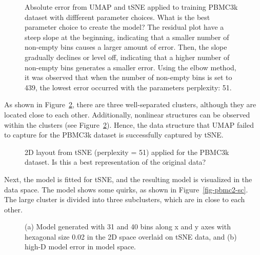 \documentclass[
  12pt]{article}
\begin{document}
\begin{figure}[H]


\caption{\label{fig-abserrorPBMC}Absolute error from UMAP and tSNE
applied to training PBMC3k dataset with diffferent parameter choices.
What is the best parameter choice to create the model? The residual plot
have a steep slope at the beginning, indicating that a smaller number of
non-empty bins causes a larger amount of error. Then, the slope
gradually declines or level off, indicating that a higher number of
non-empty bins generates a smaller error. Using the elbow method, it was
observed that when the number of non-empty bins is set to 439, the
lowest error occurred with the parameters perplexity: 51.}

\end{figure}%

As shown in Figure~\ref{fig-tsnesuggest}, there are three well-separated
clusters, although they are located close to each other. Additionally,
nonlinear structures can be observed within the clusters (see
Figure~\ref{fig-tsnesuggest}). Hence, the data structure that UMAP
failed to capture for the PBMC3k dataset is successfully captured by
tSNE.

\begin{figure}[H]


\caption{\label{fig-tsnesuggest}2D layout from tSNE (perplexity = 51)
applied for the PBMC3k dataset. Is this a best representation of the
original data?}

\end{figure}%

Next, the model is fitted for tSNE, and the resulting model is
visualized in the data space. The model shows some quirks, as shown in
Figure~\ref{fig-pbmc2-sc}. The large cluster is divided into three
subclusters, which are in close to each other.

\begin{figure}[H]


\caption{\label{fig-nldervisPBMCtSNE}(a) Model generated with 31 and 40
bins along x and y axes with hexagonal size 0.02 in the 2D space
overlaid on tSNE data, and (b) high-D model error in model space.}

\end{figure}%
\end{document}
